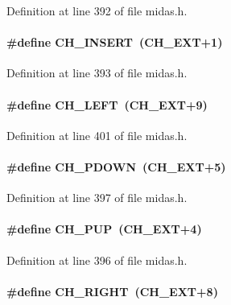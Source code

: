 Definition at line 392 of file midas.h.
\paragraph[{CH\_\-INSERT}]{\setlength{\rightskip}{0pt plus 5cm}\#define CH\_\-INSERT~(CH\_\-EXT+1)}\hfill\label{group__midasincludecode_ga8913c94a85618e302d82993dae34383b}


Definition at line 393 of file midas.h.
\paragraph[{CH\_\-LEFT}]{\setlength{\rightskip}{0pt plus 5cm}\#define CH\_\-LEFT~(CH\_\-EXT+9)}\hfill\label{group__midasincludecode_gaa4d42a7bf425bbbd6579d1c0771470b2}


Definition at line 401 of file midas.h.
\paragraph[{CH\_\-PDOWN}]{\setlength{\rightskip}{0pt plus 5cm}\#define CH\_\-PDOWN~(CH\_\-EXT+5)}\hfill\label{group__midasincludecode_gafb0b019e59fee3c8913ff71b34b486d3}


Definition at line 397 of file midas.h.
\paragraph[{CH\_\-PUP}]{\setlength{\rightskip}{0pt plus 5cm}\#define CH\_\-PUP~(CH\_\-EXT+4)}\hfill\label{group__midasincludecode_ga50aef380b855dc6f5cd5c7d895299e05}


Definition at line 396 of file midas.h.
\paragraph[{CH\_\-RIGHT}]{\setlength{\rightskip}{0pt plus 5cm}\#define CH\_\-RIGHT~(CH\_\-EXT+8)}\hfill\label{group__midasincludecode_ga8056fe48fb9d3cfa0d56c43858a59d35}


